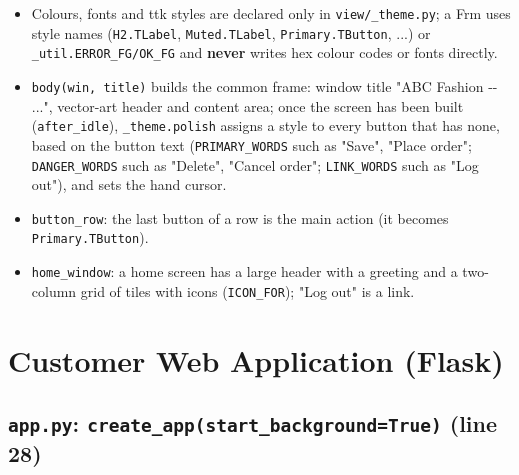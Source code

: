 \begin{itemize}
\tightlist
\item
  Colours, fonts and ttk styles are declared only in
  \texttt{view/\allowbreak{}\_\allowbreak{}theme.\allowbreak{}py}; a Frm uses style names (\texttt{H2.\allowbreak{}TLabel},
  \texttt{Muted.\allowbreak{}TLabel}, \texttt{Primary.\allowbreak{}TButton}, ...) or
  \texttt{\_\allowbreak{}util.\allowbreak{}ERROR\_\allowbreak{}FG/\allowbreak{}OK\_\allowbreak{}FG} and \textbf{never} writes hex colour
  codes or fonts directly.
\item
  \texttt{body(\allowbreak{}win,\allowbreak{} title)} builds the common frame: window title "ABC
  Fashion -\/- ...", vector-art header and content area; once the screen
  has been built (\texttt{after\_\allowbreak{}idle}), \texttt{\_\allowbreak{}theme.\allowbreak{}polish} assigns
  a style to every button that has none, based on the button text
  (\texttt{PRIMARY\_\allowbreak{}WORDS} such as "Save", "Place order";
  \texttt{DANGER\_\allowbreak{}WORDS} such as "Delete", "Cancel order";
  \texttt{LINK\_\allowbreak{}WORDS} such as "Log out"), and sets the hand cursor.
\item
  \texttt{button\_\allowbreak{}row}: the last button of a row is the main action (it
  becomes \texttt{Primary.\allowbreak{}TButton}).
\item
  \texttt{home\_\allowbreak{}window}: a home screen has a large header with a
  greeting and a two-column grid of tiles with icons
  (\texttt{ICON\_\allowbreak{}FOR}); "Log out" is a link.
\end{itemize}

\hypertarget{customer-web-application-flask}{%
\section{Customer Web Application
(Flask)}\label{customer-web-application-flask}}

\hypertarget{app.py-create_appstart_backgroundtrue-line-28}{%
\subsection{\texorpdfstring{\texttt{app.\allowbreak{}py}:
\texttt{create\_\allowbreak{}app(\allowbreak{}start\_\allowbreak{}background=\allowbreak{}True)} (line
28)}{app.py: create\_app(start\_background=True) (line 28)}}\label{app.py-create_appstart_backgroundtrue-line-28}}

